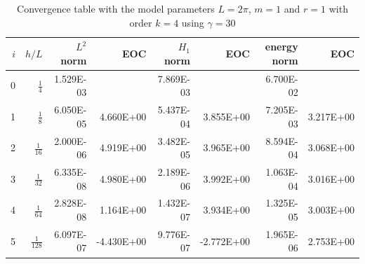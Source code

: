 \begin{table}
  \caption{\label{tab:ex2_order:c} Convergence table with the model parameters $L=2\pi$, $m=1$ and $r=1$ with order $k=4$ using $ \gamma = 30$}
  \begin{tabular}{rrrrrrrr}
    \hline\hline
    $i$&\textbf{$h/{L} $} & \textbf{$L^2$ norm} & \textbf{EOC} & \textbf{$H_1$ norm} & \textbf{EOC} & \textbf{energy norm} & \textbf{EOC} \\\hline
    0&$\frac{1}{4}$ & 1.529E-03 &  & 7.869E-03 &  & 6.700E-02 &  \\
    1&$\frac{1}{8}$ & 6.050E-05 & 4.660E+00 & 5.437E-04 & 3.855E+00 & 7.205E-03 & 3.217E+00 \\
    2&$\frac{1}{16}$ & 2.000E-06 & 4.919E+00 & 3.482E-05 & 3.965E+00 & 8.594E-04 & 3.068E+00 \\
    3&$\frac{1}{32}$ & 6.335E-08 & 4.980E+00 & 2.189E-06 & 3.992E+00 & 1.063E-04 & 3.016E+00 \\
    4&$\frac{1}{64}$ & 2.828E-08 & 1.164E+00 & 1.432E-07 & 3.934E+00 & 1.325E-05 & 3.003E+00 \\
    5&$\frac{1}{128}$ & 6.097E-07 & -4.430E+00 & 9.776E-07 & -2.772E+00 & 1.965E-06 & 2.753E+00 \\\hline\hline
  \end{tabular}
\end{table}


